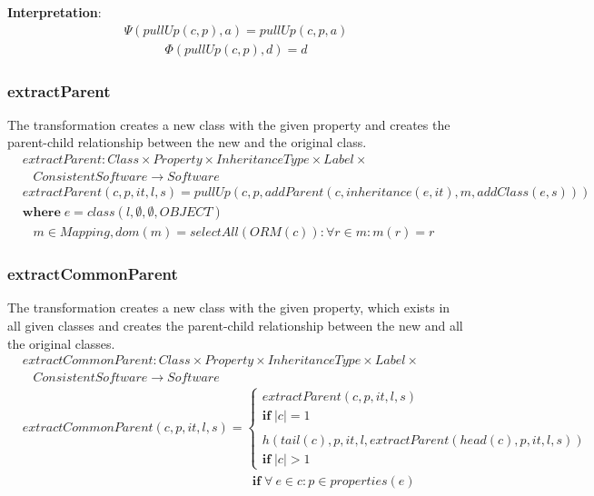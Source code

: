 \documentclass[10pt]{article}
\begin{document}
\noindent \textbf{Interpretation}:
\begin{align}
\Psi(pullUp(c, p), a) = pullUp(c, p, a)
\end{align}
\begin{align}
\Phi(pullUp(c, p), d) = d
\end{align}

\subsubsection{extractParent}
The transformation creates a new class with the given property and creates the parent-child relationship between the new and the original class.
\begin{align}
& extractParent: Class \times Property \times InheritanceType \times Label \times  \nonumber \\
& \;\;\; ConsistentSoftware \rightarrow Software \\
& extractParent(c, p, it, l, s) = pullUp(c, p, addParent(c,inheritance(e, it), m,  addClass(e, s))) \\
& \mathbf{where} \; e = class(l, \emptyset, \emptyset, OBJECT)  \nonumber \\
& \;\;\; m \in Mapping, dom(m) = selectAll(ORM(c)) : \forall r \in m :  m(r) = r \nonumber
\end{align}


\subsubsection{extractCommonParent}
The transformation creates a new class with the given property, which exists in all given classes and creates the parent-child relationship between the new and all the original classes.
\begin{align}
& extractCommonParent: Class \times Property \times InheritanceType \times Label \times
\nonumber \\
& \;\;\; ConsistentSoftware \rightarrow Software \\
& extractCommonParent(c, p, it, l, s) = \begin{cases}
     extractParent(c, p, it, l, s) \\
     \mathbf{if} \; |c| = 1 \\\\
     h(tail(c), p, it, l, extractParent(head(c), p, it, l, s)) \\
       \mathbf{if} \; |c| > 1
 \end{cases} \\
& \;\;\;\;\;\;\;\;\;\;\;\;\;\;\;\;\;\;\;\;\;\;\;\;\;\;\;\;\;\;\;\;\;\;\;\;\;\;\;\;\;\;\;\;\;\;\;\;\;\;\;\;\;\;\;\;\;\;\;\;\;\;\;\;\; \mathbf{if} \; \forall \: e \in c : p \in properties(e)
\end{align}
\end{document}
